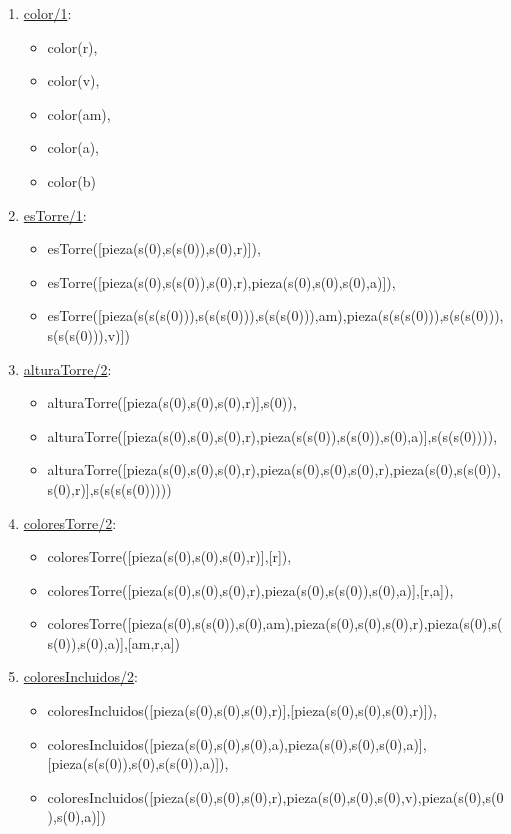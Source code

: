 \documentclass[12pt, a4paper, spanish]{article}
\begin{document}
\begin{enumerate}
\item \underline{color/1}:
\begin{itemize}
	\item color(r),             
	\item color(v),             
	\item color(am),
	\item color(a),
	\item color(b)
\end{itemize}

\item \underline{esTorre/1}:
\begin{itemize}
	\item esTorre([pieza(s(0),s(s(0)),s(0),r)]),             
	\item esTorre([pieza(s(0),s(s(0)),s(0),r),pieza(s(0),s(0),s(0),a)]),             
	\item esTorre([pieza(s(s(s(0))),s(s(s(0))),s(s(s(0))),am),pieza(s(s(s(0))),s(s(s(0))),s(s(s(0))),v)])
\end{itemize}

\item \underline{alturaTorre/2}:
\begin{itemize}
	\item alturaTorre([pieza(s(0),s(0),s(0),r)],s(0)),             
	\item alturaTorre([pieza(s(0),s(0),s(0),r),pieza(s(s(0)),s(s(0)),s(0),a)],s(s(s(0)))),   
	\item alturaTorre([pieza(s(0),s(0),s(0),r),pieza(s(0),s(0),s(0),r),pieza(s(0),s(s(0)),s(0),r)],s(s(s(s(0)))))
\end{itemize}

\item \underline{coloresTorre/2}:
\begin{itemize}
	\item coloresTorre([pieza(s(0),s(0),s(0),r)],[r]),             
	\item coloresTorre([pieza(s(0),s(0),s(0),r),pieza(s(0),s(s(0)),s(0),a)],[r,a]),             
	\item coloresTorre([pieza(s(0),s(s(0)),s(0),am),pieza(s(0),s(0),s(0),r),pieza(s(0),s(s(0)),s(0),a)],[am,r,a])
\end{itemize}

\item \underline{coloresIncluidos/2}:
\begin{itemize}
	\item coloresIncluidos([pieza(s(0),s(0),s(0),r)],[pieza(s(0),s(0),s(0),r)]),             
	\item coloresIncluidos([pieza(s(0),s(0),s(0),a),pieza(s(0),s(0),s(0),a)],[pieza(s(s(0)),s(0),s(s(0)),a)]),             
	\item coloresIncluidos([pieza(s(0),s(0),s(0),r),pieza(s(0),s(0),s(0),v),pieza(s(0),s(0),s(0),a)])
\end{itemize}


\end{enumerate}
\end{document}
